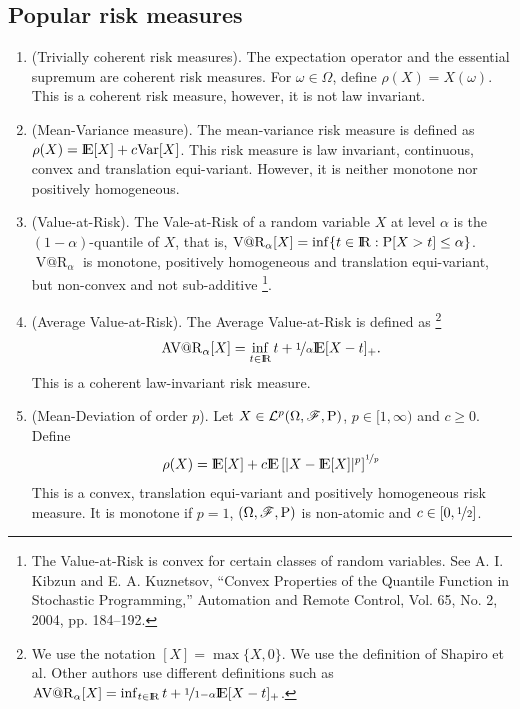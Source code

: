 \documentclass[a4paper,10pt]{article}
\begin{document}
\subsection{Popular risk measures}
\begin{enumerate}
 \item (Trivially coherent risk measures). The expectation operator and the essential supremum are 
       coherent risk measures. For $\omega\in\Omega$, define $\rho(X) = X(\omega)$. This is a coherent
       risk measure, however, it is not law invariant.
       
 \item (Mean-Variance measure).  The mean-variance risk measure is defined as $\rho(X) = \E[X] + c \mathrm{Var}[X]$.
       This risk measure is law invariant, continuous, convex and translation equi-variant. 
       However, it is neither monotone nor positively homogeneous.
       
 \item (Value-at-Risk). The Vale-at-Risk of a random variable $X$ at level $\alpha$ is the $(1-\alpha)$-quantile of $X$,
       that is, $\operatorname{V@R}_\alpha[X] = \inf\{t\in\Re: \prob[X>t]\leq \alpha\}$. $\operatorname{V@R}_\alpha$ 
       is monotone, positively homogeneous and translation equi-variant, but non-convex and not sub-additive%
	  \footnote{The Value-at-Risk is convex for certain classes of random variables. 
	            See A. I. Kibzun and E. A. Kuznetsov, ``Convex Properties of the Quantile Function 
	            in Stochastic Programming,'' Automation and Remote Control, Vol. 65, No. 2, 2004, 
	            pp. 184--192.}.
	  
 \item (Average Value-at-Risk). The Average Value-at-Risk is defined as%
	  \footnote{We use the notation $[X]=\max\{X,0\}$. We use the definition of Shapiro et al. Other authors
	            use different definitions such as $\operatorname{AV@R}_\alpha[X] = \inf_{t\in\Re}t + \nicefrac{1}{1-\alpha}\E[X-t]_+$.}
       \[
          \operatorname{AV@R}_\alpha[X] = \inf_{t\in\Re}t + \nicefrac{1}{\alpha}\E[X-t]_+.
       \]
       This is a coherent law-invariant risk measure.
       
 \item (Mean-Deviation of order $p$). Let $X\in\mathcal{L}^p(\Omega,\mathscr{F},\mathrm{P})$, $p\in[1,\infty)$ and $c\geq 0$.
       Define
       \[
        \rho(X) = \E[X] + c \E\left[ |X-\E[X]|^p\right]^{\nicefrac{1}{p}}
       \]
       This is a convex, translation equi-variant and positively homogeneous risk measure.
       It is monotone if $p=1$, $(\Omega,\mathscr{F},\mathrm{P})$ is non-atomic and $c\in[0,\nicefrac{1}{2}]$.
       

\end{enumerate}
\end{document}
